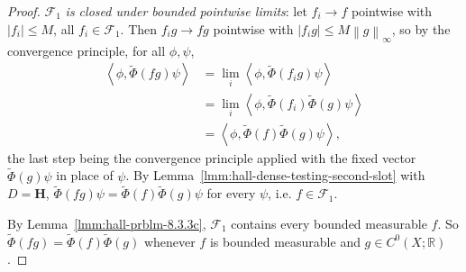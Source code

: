 \begin{proof}
$\mathcal{F}_1$ \textit{is closed under bounded pointwise limits}: let $f_i \to f$ pointwise with $\lvert f_i \rvert \le M$, all $f_i \in \mathcal{F}_1$. Then $f_ig \to fg$ pointwise with $\lvert f_ig \rvert \le M\left\| g \right\|_\infty$, so by the convergence principle, for all $\phi,\psi$,
\begin{align}
    \left< \phi, \widetilde\Phi(fg)\psi \right> &= \lim_i \left< \phi, \widetilde\Phi(f_ig)\psi \right> \\
                &= \lim_i \left< \phi, \widetilde\Phi(f_i)\widetilde\Phi(g)\psi \right> \\
                &= \left< \phi, \widetilde\Phi(f)\widetilde\Phi(g)\psi \right>,
\end{align}
the last step being the convergence principle applied with the fixed vector $\widetilde\Phi(g)\psi$ in place of $\psi$. By Lemma~\ref{lmm:hall-dense-testing-second-slot} with $D = \mathbf{H}$, $\widetilde\Phi(fg)\psi = \widetilde\Phi(f)\widetilde\Phi(g)\psi$ for every $\psi$, i.e. $f \in \mathcal{F}_1$.

By Lemma~\ref{lmm:hall-prblm-8.3.3c}, $\mathcal{F}_1$ contains every bounded measurable $f$. So $\widetilde\Phi(fg) = \widetilde\Phi(f)\widetilde\Phi(g)$ whenever $f$ is bounded measurable and $g \in C^0(X;\mathbb{R})$.


\end{proof}
